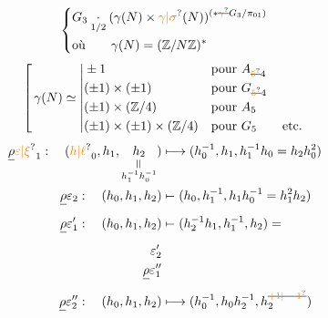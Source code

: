 \[
\left\{\begin{aligned}
&G_3\underset{1/2}{\cdot}(\gamma(N)\times\unsure{\gamma|\sigma}(N))^{(*\deleted{\unsure{\gamma}}G_3/\pi_{01})}\\
&\text{où}\qquad\gamma(N)=(\mathbb Z/N\mathbb Z)^*
\end{aligned}\right.
\]
\[
\left[\,\gamma(N)\simeq
\left|\begin{aligned}
&\pm1 &&\text{pour }A_{\deleted{\unsure{5}}4}\\
&(\pm1)\times(\pm1)&&\text{pour }G_{\deleted{\unsure{5}}4}\\
&(\pm1)\times(\mathbb Z/4)&&\text{pour }A_5\\
&(\pm1)\times(\pm1)\times(\mathbb Z/4)&&\text{pour }G_5\qquad\text{etc.}
\end{aligned}\right.\right.
\]
\[
\begin{aligned}
\deleted{\rho}\unsure{\varepsilon|\xi}_1:\quad
 (\unsure{h|\ell}_0,h_1,\underset{\substack{\rotatebox{90}{$=$}\\h_1^{-1}h_0^{-1}}}{h_2})
 &\longmapsto (h_0^{-1},h_1,h_1^{-1}h_0=h_2h_0^2)\\
\deleted{\rho}\varepsilon_2:\quad(h_0,h_1,h_2)&\mathrel{\mapstochar\relbar}(h_0,h_1^{-1},h_1h_0^{-1}=h_1^2h_2)\\
\deleted{\rho}\varepsilon'_1:\quad(h_0,h_1,h_2)&\mathrel{\mapstochar\relbar}(h_{2}^{-1}h_1,h_1^{-1},h_2)=\\
\varepsilon'_2&\\
\deleted{\rho}\varepsilon''_1&\\
\deleted{\rho}\varepsilon''_2:\quad(h_0,h_1,h_2)&\longmapsto(h_0^{-1},h_0h_2^{-1},h_2^{\deleted{\unsure{+1|-1}}})
\end{aligned}
\]

